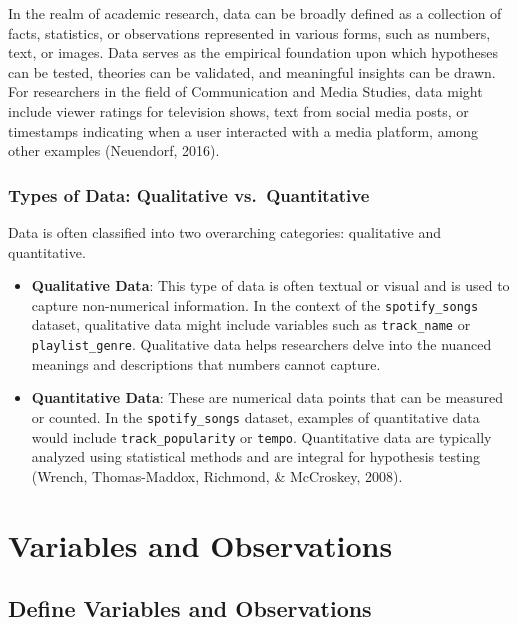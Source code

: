 \documentclass[
]{book}
\begin{document}
In the realm of academic research, data can be broadly defined as a collection of facts, statistics, or observations represented in various forms, such as numbers, text, or images. Data serves as the empirical foundation upon which hypotheses can be tested, theories can be validated, and meaningful insights can be drawn. For researchers in the field of Communication and Media Studies, data might include viewer ratings for television shows, text from social media posts, or timestamps indicating when a user interacted with a media platform, among other examples (Neuendorf, 2016).

\hypertarget{types-of-data-qualitative-vs.-quantitative}{%
\subsubsection*{Types of Data: Qualitative vs.~Quantitative}\label{types-of-data-qualitative-vs.-quantitative}}

Data is often classified into two overarching categories: qualitative and quantitative.

\begin{itemize}
\item
  \textbf{Qualitative Data}: This type of data is often textual or visual and is used to capture non-numerical information. In the context of the \texttt{spotify\_songs} dataset, qualitative data might include variables such as \texttt{track\_name} or \texttt{playlist\_genre}. Qualitative data helps researchers delve into the nuanced meanings and descriptions that numbers cannot capture.
\item
  \textbf{Quantitative Data}: These are numerical data points that can be measured or counted. In the \texttt{spotify\_songs} dataset, examples of quantitative data would include \texttt{track\_popularity} or \texttt{tempo}. Quantitative data are typically analyzed using statistical methods and are integral for hypothesis testing (Wrench, Thomas-Maddox, Richmond, \& McCroskey, 2008).
\end{itemize}

\hypertarget{variables-and-observations}{%
\section{Variables and Observations}\label{variables-and-observations}}

\hypertarget{define-variables-and-observations}{%
\subsection*{Define Variables and Observations}\label{define-variables-and-observations}}
\end{document}
